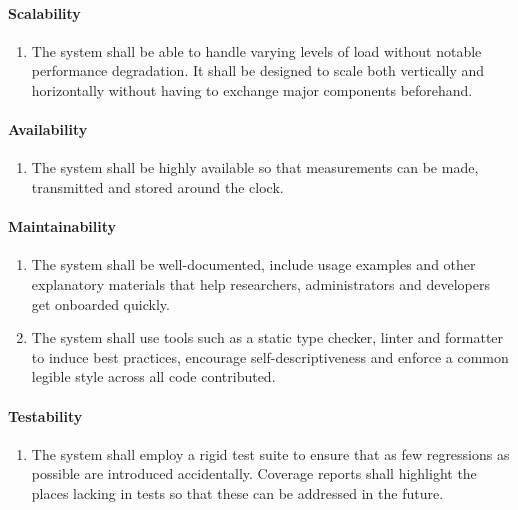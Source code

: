 \paragraph{Scalability}
\begin{enumerate}[resume, font=\sffamily, label={\textbf{NFR-\protect\twodigits{\theenumi}}},leftmargin=1.7cm, ref=NFR-\protect\twodigits{\theenumi}]
	\item The system shall be able to handle varying levels of load without notable performance degradation. It shall be designed to scale both vertically and horizontally without having to exchange major components beforehand.\label{itm:nfr-scalability}
\end{enumerate}

\paragraph{Availability}
\begin{enumerate}[resume, font=\sffamily, label={\textbf{NFR-\protect\twodigits{\theenumi}}},leftmargin=1.7cm, ref=NFR-\protect\twodigits{\theenumi}]
	\item The system shall be highly available so that measurements can be made, transmitted and stored around the clock.\label{itm:nfr-availability}
\end{enumerate}

\paragraph{Maintainability}
\begin{enumerate}[resume, font=\sffamily, label={\textbf{NFR-\protect\twodigits{\theenumi}}},leftmargin=1.7cm, ref=NFR-\protect\twodigits{\theenumi}]
	\item The system shall be well-documented, include usage examples and other explanatory materials that help researchers, administrators and developers get onboarded quickly.\label{itm:nfr-maintainability-documentation}
	\item The system shall use tools such as a static type checker, linter and formatter to induce best practices, encourage self-descriptiveness and enforce a common legible style across all code contributed.\label{itm:nfr-maintainability-tools}
\end{enumerate}

\paragraph{Testability}
\begin{enumerate}[resume, font=\sffamily, label={\textbf{NFR-\protect\twodigits{\theenumi}}},leftmargin=1.7cm, ref=NFR-\protect\twodigits{\theenumi}]
	\item The system shall employ a rigid test suite to ensure that as few regressions as possible are introduced accidentally. Coverage reports shall highlight the places lacking in tests so that these can be addressed in the future.\label{itm:nfr-testability}
\end{enumerate}


